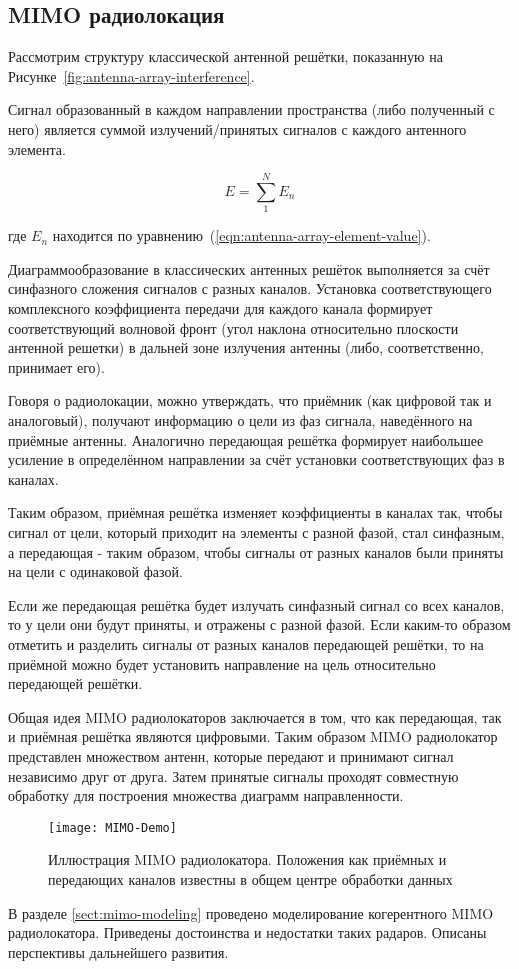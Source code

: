 \subsection{MIMO радиолокация}\label{sect:mimo-theory}

Рассмотрим структуру классической антенной решётки, показанную на Рисунке~\ref{fig:antenna-array-interference}. 

Сигнал образованный в каждом направлении пространства (либо полученный с него) является суммой 
излучений/принятых сигналов с каждого антенного элемента.

\begin{equation*}
    E=\sum_{1}^{N} E_n
\end{equation*}

\noindent где $E_n$ находится по уравнению~(\ref{eqn:antenna-array-element-value}).

Диаграммообразование в классических антенных решёток выполняется за счёт синфазного сложения сигналов с разных каналов. 
Установка соответствующего комплексного коэффициента передачи для каждого канала формирует соответствующий волновой фронт 
(угол наклона относительно плоскости антенной решетки) в дальней зоне излучения антенны (либо, соответственно, принимает его). 

Говоря о радиолокации, можно утверждать, что приёмник (как цифровой так и аналоговый), получают информацию о цели из 
фаз сигнала, наведённого на приёмные антенны. Аналогично передающая решётка формирует наибольшее усиление в 
определённом направлении за счёт установки соответствующих фаз в каналах. 

Таким образом, приёмная решётка изменяет коэффициенты в каналах так, чтобы сигнал от цели, который приходит на элементы 
с разной фазой, стал синфазным, а передающая - таким образом, чтобы сигналы от разных каналов 
были приняты на цели с одинаковой фазой. 

Если же передающая решётка будет излучать синфазный сигнал со всех каналов, то у цели они будут приняты, 
и отражены с разной фазой. Если каким-то образом отметить и разделить сигналы от разных каналов передающей решётки, 
то на приёмной можно будет установить направление на цель относительно передающей решётки. 

Общая идея MIMO радиолокаторов заключается в том, что как передающая, так и приёмная решётка являются цифровыми.
Таким образом MIMO радиолокатор представлен множеством антенн, 
которые передают и принимают сигнал независимо друг от друга. 
Затем принятые сигналы проходят совместную обработку для построения множества диаграмм направленности.

\begin{figure}[H]
    \centering
    \texttt{[image: MIMO-Demo]}
    \caption{Иллюстрация MIMO радиолокатора. Положения как приёмных и передающих каналов известны в общем центре обработки данных}%
    \label{fig:mimo-demo}
\end{figure}

В разделе \ref{sect:mimo-modeling} проведено моделирование когерентного MIMO радиолокатора. 
Приведены достоинства и недостатки таких радаров. Описаны перспективы дальнейшего развития.

